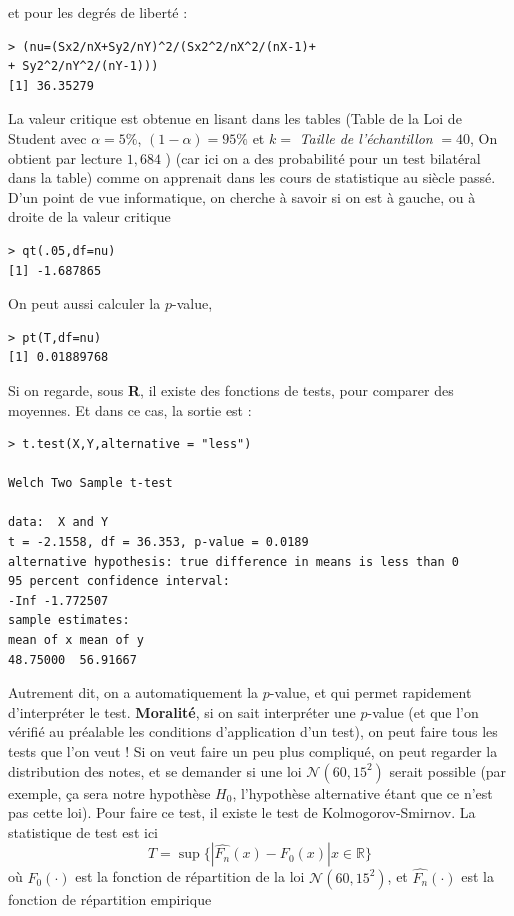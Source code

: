et pour les degrés de liberté :
\begin{lstlisting}[language=html]
> (nu=(Sx2/nX+Sy2/nY)^2/(Sx2^2/nX^2/(nX-1)+
+ Sy2^2/nY^2/(nY-1)))
[1] 36.35279
\end{lstlisting}

La valeur critique est obtenue en lisant dans les tables (Table de la Loi de Student avec $\alpha = 5\%$, $(1-\alpha) = 95\%$ et $k =$ \textit{Taille de l'échantillon} $= 40$, On obtient par lecture $1,684$ ) (car ici on a des probabilité pour un test bilatéral dans la table) comme on apprenait dans les cours de statistique au siècle passé. D'un point de vue informatique, on cherche à savoir si on est à gauche, ou à droite de la valeur critique 

\begin{lstlisting}[language=html]
> qt(.05,df=nu)
[1] -1.687865
\end{lstlisting}
On peut aussi calculer la $p$-value,
\begin{lstlisting}[language=html]
> pt(T,df=nu)
[1] 0.01889768
\end{lstlisting}
Si on regarde, sous \textbf{R}, il existe des fonctions de tests, pour comparer des moyennes. Et dans ce cas, la sortie est : 
\begin{lstlisting}[language=html]
> t.test(X,Y,alternative = "less")

Welch Two Sample t-test

data:  X and Y
t = -2.1558, df = 36.353, p-value = 0.0189
alternative hypothesis: true difference in means is less than 0
95 percent confidence interval:
-Inf -1.772507
sample estimates:
mean of x mean of y
48.75000  56.91667
\end{lstlisting}
Autrement dit, on a automatiquement la $p$-value, et qui permet rapidement d'interpréter le test. \textbf{Moralité}, si on sait interpréter une $p$-value (et que l'on vérifié au préalable les conditions d'application d'un test), on peut faire tous les tests que l'on veut !\newline
Si on veut faire un peu plus compliqué, on peut regarder la distribution des notes, et se demander si une loi $\mathcal{N} (60,15^{2})$ serait possible (par exemple, ça sera notre hypothèse $H_{0}$, l'hypothèse alternative étant que ce n'est pas cette loi). Pour faire ce test, il existe le test de Kolmogorov-Smirnov. La statistique de test est ici
$$T=\sup\{|\widehat{F_{n}}(x)-F_{0}(x)|x\in\mathbb{R}\}$$
où $F_{0}(\cdot)$ est la fonction de répartition de la loi $\mathcal{N} (60,15^{2})$, et $\widehat{F_{n}}(\cdot)$ est la fonction de répartition empirique
